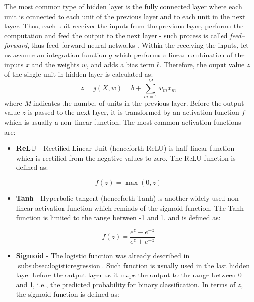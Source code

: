 The most common type of hidden layer is the fully connected layer where each unit is connected to each unit of the previous layer and to each unit in the next layer.
Thus, each unit receives the inputs from the previous layer, performs the computation and feed the output to the next layer - such process is called \textit{feed--forward}, thus feed--forward neural networks \citep{charu2018neural}.
Within the receiving the inputs, let us assume an integration function $g$ which performs a linear combination of the inputs $x$ and the weights $w$, and adds a bias term $b$.
Therefore, the ouput value $z$ of the single unit in hidden layer is calculated as:
\begin{equation}
    z = g\left(X,w\right)= b + \sum_{m=1}^{M} w_m x_m
\end{equation}
where $M$ indicates the number of units in the previous layer.
Before the output value $z$ is passed to the next layer, it is transformed by an activation function $f$ which is usually a non--linear function. The most common activation functions are:
\begin{itemize}\setlength\itemsep{0cm}
\item \textbf{ReLU} - Rectified Linear Unit (henceforth ReLU) is half--linear function which is rectified from the negative values to zero. The ReLU function is defined as:
\end{itemize}
\begin{equation}
    f(z) = \max(0,z)
\end{equation}
\begin{itemize}\setlength\itemsep{0cm}
    \item \textbf{Tanh} - Hyperbolic tangent (henceforth Tanh) is another widely used non--linear activation function which reminds of the sigmoid function. The Tanh function is limited to the range between -1 and 1, and is defined as:
    \end{itemize}
\begin{equation}
    f(z) = \frac{e^z - e^{-z}}{e^z + e^{-z}}
\end{equation}
\begin{itemize}\setlength\itemsep{0cm}
    \item \textbf{Sigmoid} - The logistic function was already described in \autoref{subsubsec:logisticregression}. Such function is usually used in the last hidden layer before the output layer as it maps the output to the range between 0 and 1, i.e., the predicted probability for binary classification. In terms of $z$, the sigmoid function is defined as:
    \end{itemize}
